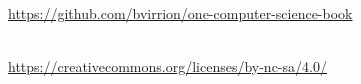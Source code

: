 \thispagestyle{empty}
\vspace*{\fill}
\begin{center}
\omcolophonsource\\[2pt]
\url{https://github.com/bvirrion/one-computer-science-book}

\bigskip
\omcolophonlicense\\[2pt]
\url{https://creativecommons.org/licenses/by-nc-sa/4.0/}\\[6pt]
\omcolophoncredit
\end{center}
\vspace*{\fill}
\clearpage
